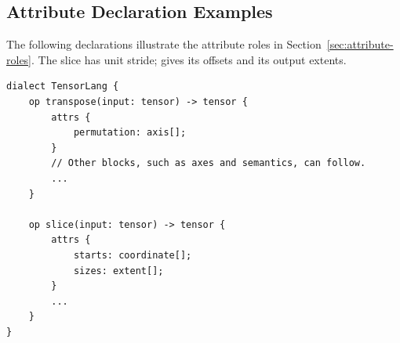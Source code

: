 \subsection{Attribute Declaration Examples}
\label{app:language-declarations}
The following declarations illustrate the attribute roles in
Section~\ref{sec:attribute-roles}. The slice has unit stride;
 gives its offsets and  its output extents.

\begin{lstlisting}[language=TEPL]
dialect TensorLang {
    op transpose(input: tensor) -> tensor {
        attrs {
            permutation: axis[];
        }
        // Other blocks, such as axes and semantics, can follow.
        ...
    }

    op slice(input: tensor) -> tensor {
        attrs {
            starts: coordinate[];
            sizes: extent[];
        }
        ...
    }
}
\end{lstlisting}
